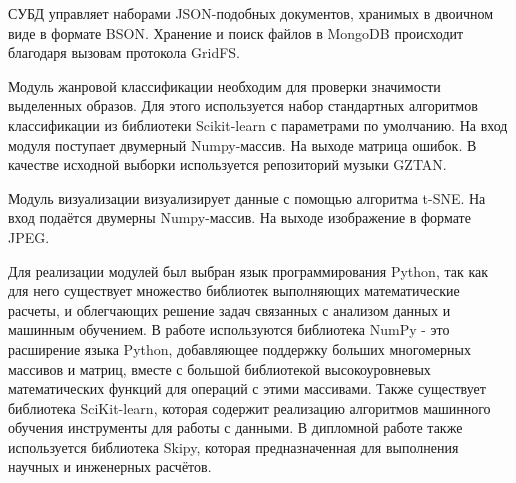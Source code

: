 СУБД управляет наборами JSON-подобных документов, хранимых в двоичном виде в формате BSON. Хранение и поиск файлов в MongoDB происходит благодаря вызовам протокола GridFS.

Модуль жанровой классификации необходим для проверки значимости выделенных образов. Для этого используется набор стандартных алгоритмов классификации из библиотеки Scikit-learn с параметрами по умолчанию. На вход модуля поступает двумерный Numpy-массив. На выходе матрица ошибок. В качестве исходной выборки используется репозиторий музыки GZTAN.

Модуль визуализации визуализирует данные с помощью алгоритма t-SNE. На вход подаётся двумерны Numpy-массив. На выходе изображение в формате JPEG.

Для реализации модулей был выбран язык программирования Python, так как для него существует множество библиотек выполняющих математические расчеты, и облегчающих решение задач связанных с анализом данных и машинным обучением. В работе используются библиотека NumPy - это расширение языка Python, добавляющее поддержку больших многомерных массивов и матриц, вместе с большой библиотекой высокоуровневых математических функций для операций с этими массивами. Также существует библиотека SciKit-learn, которая содержит реализацию алгоритмов машинного обучения инструменты для работы с данными. В дипломной работе также используется библиотека Skipy, которая предназначенная для выполнения научных и инженерных расчётов.

